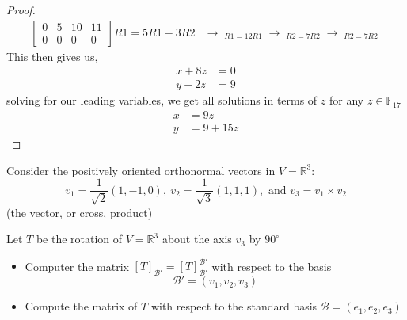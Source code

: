 \documentclass[11pt]{article}
\newenvironment{problem}[2][Problem\!]{\begin{trivlist}
\item[\hskip \labelsep {\bfseries #1}\hskip \labelsep {\bfseries #2}]}{\end{trivlist}}
\newcommand{\rr}{\mathbb R}   %
\newcommand*{\putunder}[2]{%
  {\mathop{#1}_{\textstyle #2}}%
}
\begin{document}
\begin{proof}
\begin{align*}
{\begin{bmatrix}
      0 & 5 & 10 & 11 \\
      0 & 0 & 0 & 0 
    \end{bmatrix}}{R1 = 5R1 - 3R2} 
    &\rightarrow \putunder{\begin{bmatrix}
      10 & 0 & 12 & 10 \\
      0 & 5 & 10 & 11 \\
      0 & 0 & 0 & 0 
    \end{bmatrix}}{R1 = 12R1} \rightarrow \putunder{\begin{bmatrix}
      1 & 0 & 8 & 0 \\
      0 & 5 & 10 & 11 \\
      0 & 0 & 0 & 0 
    \end{bmatrix}}{R2 = 7R2} \rightarrow \putunder{\begin{bmatrix}
      1 & 0 & 8 & 0 \\
      0 & 1 & 2 & 9 \\
      0 & 0 & 0 & 0 
    \end{bmatrix}}{R2 = 7R2}
  \end{align*}
  This then gives us,
  \begin{align*}
    x + 8z &= 0 \\
    y + 2z &= 9
  \end{align*}
  solving for our leading variables, we get all solutions in terms of $z$ for any $z \in \mathbb{F}_{17}$
  \begin{align*}
    x &= 9z \\
    y &= 9 + 15z
  \end{align*}
  

\end{proof}

\newpage
\begin{tcolorbox}
  \begin{problem} {P3}
    Consider the positively oriented orthonormal vectors in $V = \rr^{3}$:
    \[v_1 = \frac{1}{\sqrt{2}}(1,-1,0), \ v_2 = \frac{1}{\sqrt{3}}(1,1,1), \text{ and } v_3 = v_1 \times v_2\]
    (the vector, or cross, product)

    Let $T$ be the rotation of $V = \rr^{3}$ about the axis $v_3$ by $90^{\circ}$

    \begin{itemize}
      \item[(1)] Computer the matrix $[T]_{\mathcal{B}'} = [T]_{\mathcal{B}'}^{\mathcal{B}'}$ with respect to the basis 
      \[\mathcal{B'} = (v_1, v_2, v_3)\]
      \item[(2)] Compute the matrix of $T$ with respect to the standard basis $\mathcal{B} = (e_1, e_2, e_3)$ 
    \end{itemize}
  \end{problem}
\end{tcolorbox}
\end{document}

